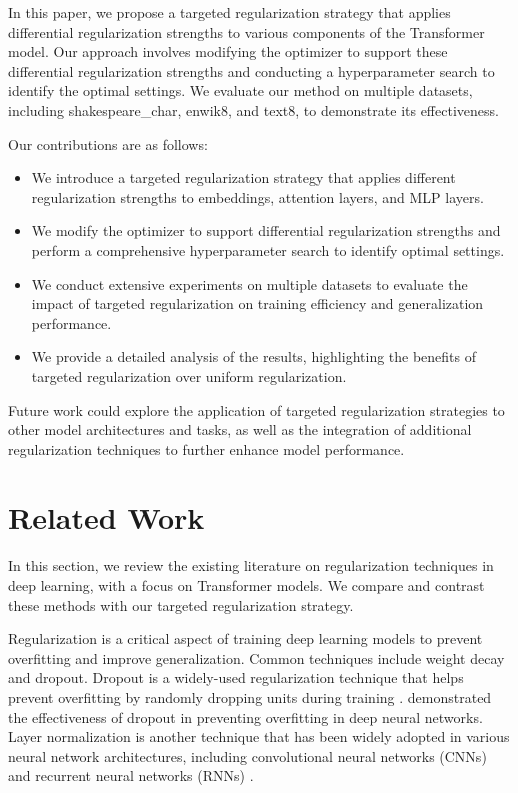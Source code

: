 \documentclass{article} %
\begin{document}
In this paper, we propose a targeted regularization strategy that applies differential regularization strengths to various components of the Transformer model. Our approach involves modifying the optimizer to support these differential regularization strengths and conducting a hyperparameter search to identify the optimal settings. We evaluate our method on multiple datasets, including shakespeare\_char, enwik8, and text8, to demonstrate its effectiveness.

Our contributions are as follows:
\begin{itemize}
    \item We introduce a targeted regularization strategy that applies different regularization strengths to embeddings, attention layers, and MLP layers.
    \item We modify the optimizer to support differential regularization strengths and perform a comprehensive hyperparameter search to identify optimal settings.
    \item We conduct extensive experiments on multiple datasets to evaluate the impact of targeted regularization on training efficiency and generalization performance.
    \item We provide a detailed analysis of the results, highlighting the benefits of targeted regularization over uniform regularization.
\end{itemize}

Future work could explore the application of targeted regularization strategies to other model architectures and tasks, as well as the integration of additional regularization techniques to further enhance model performance.

\section{Related Work}
\label{sec:related}

In this section, we review the existing literature on regularization techniques in deep learning, with a focus on Transformer models. We compare and contrast these methods with our targeted regularization strategy.

Regularization is a critical aspect of training deep learning models to prevent overfitting and improve generalization. Common techniques include weight decay and dropout. Dropout is a widely-used regularization technique that helps prevent overfitting by randomly dropping units during training \citep{Srivastava2014DropoutAS}. \citet{Hinton2012ImprovingNN} demonstrated the effectiveness of dropout in preventing overfitting in deep neural networks. Layer normalization \citep{ba2016layer} is another technique that has been widely adopted in various neural network architectures, including convolutional neural networks (CNNs) and recurrent neural networks (RNNs) \citep{krizhevsky2012imagenet}.
\end{document}
